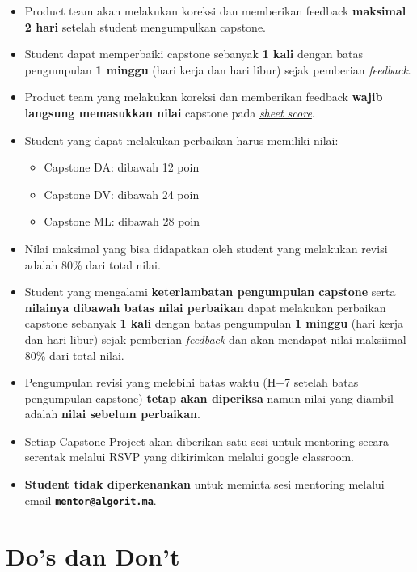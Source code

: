\documentclass[
]{book}
\providecommand{\tightlist}{%
  \setlength{\itemsep}{0pt}\setlength{\parskip}{0pt}}
\begin{document}
\begin{itemize}
\tightlist
\item
  Product team akan melakukan koreksi dan memberikan feedback \textbf{maksimal 2 hari} setelah student mengumpulkan capstone.
\item
  Student dapat memperbaiki capstone sebanyak \textbf{1 kali} dengan batas pengumpulan \textbf{1 minggu} (hari kerja dan hari libur) sejak pemberian \emph{feedback}.
\item
  Product team yang melakukan koreksi dan memberikan feedback \textbf{wajib langsung memasukkan nilai} capstone pada \href{https://docs.google.com/spreadsheets/d/1cGJ0pn9k9gKCBnceWVwaL9D7BBDMNjLh8uPYlaBlJi8/edit?usp=sharing}{\emph{sheet score}}.
\item
  Student yang dapat melakukan perbaikan harus memiliki nilai:

  \begin{itemize}
  \tightlist
  \item
    Capstone DA: dibawah 12 poin
  \item
    Capstone DV: dibawah 24 poin
  \item
    Capstone ML: dibawah 28 poin
  \end{itemize}
\item
  Nilai maksimal yang bisa didapatkan oleh student yang melakukan revisi adalah 80\% dari total nilai.
\item
  Student yang mengalami \textbf{keterlambatan pengumpulan capstone} serta \textbf{nilainya dibawah batas nilai perbaikan} dapat melakukan perbaikan capstone sebanyak \textbf{1 kali} dengan batas pengumpulan \textbf{1 minggu} (hari kerja dan hari libur) sejak pemberian \emph{feedback} dan akan mendapat nilai maksiimal 80\% dari total nilai.
\item
  Pengumpulan revisi yang melebihi batas waktu (H+7 setelah batas pengumpulan capstone) \textbf{tetap akan diperiksa} namun nilai yang diambil adalah \textbf{nilai sebelum perbaikan}.
\item
  Setiap Capstone Project akan diberikan satu sesi untuk mentoring secara serentak melalui RSVP yang dikirimkan melalui google classroom.
\item
  \textbf{Student tidak diperkenankan} untuk meminta sesi mentoring melalui email \textbf{\href{mailto:mentor@algorit.ma}{\nolinkurl{mentor@algorit.ma}}}.
\end{itemize}

\hypertarget{dos-dan-dont}{%
\chapter{Do's dan Don't}\label{dos-dan-dont}}
\end{document}
